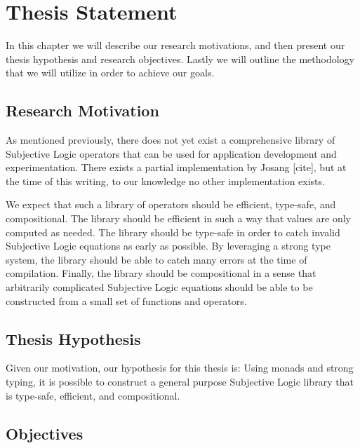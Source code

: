 \documentclass[thesis.tex]{subfiles}
\begin{document}
\chapter{Thesis Statement}
\label{chap:thesis-statement}

In this chapter we will describe our research motivations, and then present our thesis hypothesis and
research objectives. Lastly we will outline the methodology that we will utilize in order to
achieve our goals.



\section{Research Motivation}

As mentioned previously, there does not yet exist a comprehensive library of Subjective
Logic operators that can be used for application development and experimentation. There
exists a partial implementation by Josang [cite], but at the time of this writing, to our
knowledge no other implementation exists.

We expect that such a library of operators should be efficient, type-safe, and compositional.
The library should be efficient in such a way that values are only computed as needed. The
library should be type-safe in order to catch invalid Subjective Logic equations as early as
possible. By leveraging a strong type system, the library should be able to catch many errors
at the time of compilation. Finally, the library should be compositional in a sense that
arbitrarily complicated Subjective Logic equations should be able to be constructed from a
small set of functions and operators.







\section{Thesis Hypothesis}

Given our motivation, our hypothesis for this thesis is: Using monads and strong typing, it is
possible to construct a general purpose Subjective Logic library that is type-safe, efficient,
and compositional.




\section{Objectives}
\end{document}
